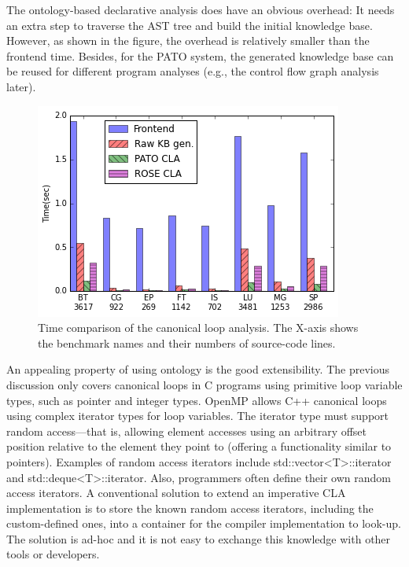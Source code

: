 The ontology-based declarative analysis does have an obvious overhead:
It needs an extra step to traverse the AST tree and build the initial
knowledge base.  However, as shown in the figure, the overhead is
relatively smaller than the frontend time.  Besides, for the PATO
system, the generated knowledge base can be reused for different
program analyses (e.g., the control flow graph analysis
later). 

\begin{figure}[h]
\centering
	\includegraphics[width=.6\columnwidth]{graph/npb-cl.png}
	\caption{Time comparison of the canonical loop analysis. The
          X-axis shows the benchmark names and their numbers of
          source-code lines.}
	\label{fig:npb-cl}
\end{figure}


 An appealing property of using ontology
is the good extensibility. The previous discussion only covers
canonical loops in C programs using primitive loop variable types,
such as pointer and integer types.  OpenMP allows C++ canonical loops
using complex iterator types for loop variables.
The iterator type must support random access---that is, allowing
element accesses using an arbitrary offset position relative to the
element they point to (offering a functionality similar to pointers).
Examples of random access iterators include \textsf{std::vector<T>::iterator} and \textsf{std::deque<T>::iterator}. %
Also, programmers often define their own random access iterators. 
A conventional solution to extend an imperative CLA implementation is to store the known random access iterators, including the custom-defined ones, into a container for the compiler implementation to look-up. 
The solution is ad-hoc and it is not easy to exchange this knowledge with other tools or developers.


